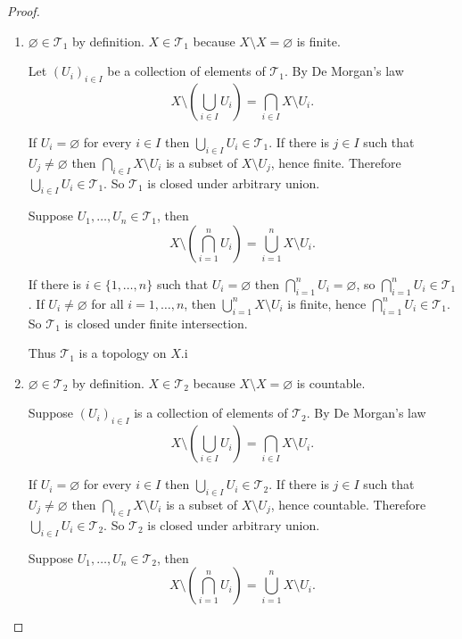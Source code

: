 \begin{proof}
	\begin{enumerate}[label={(\alph*)}]
		\item $\varnothing\in\mathscr{T}_{1}$ by definition. $X\in\mathscr{T}_{1}$ because $X\setminus X = \varnothing$ is finite.

		      Let ${(U_{i})}_{i\in I}$ be a collection of elements of $\mathscr{T}_{1}$. By De Morgan's law
		      \[
			      X\setminus \left(\bigcup_{i\in I} U_{i}\right) = \bigcap_{i\in I} X\setminus U_{i}.
		      \]

		      If $U_{i} = \varnothing$ for every $i\in I$ then $\bigcup_{i\in I} U_{i}\in\mathscr{T}_{1}$. If there is $j\in I$ such that $U_{j}\ne\varnothing$ then $\bigcap_{i\in I} X\setminus U_{i}$ is a subset of $X\setminus U_{j}$, hence finite. Therefore $\bigcup_{i\in I} U_{i}\in\mathscr{T}_{1}$. So $\mathscr{T}_{1}$ is closed under arbitrary union.

		      Suppose $U_{1}, \ldots, U_{n}\in\mathscr{T}_{1}$, then
		      \[
			      X\setminus \left(\bigcap^{n}_{i=1}U_{i}\right) = \bigcup^{n}_{i=1}X\setminus U_{i}.
		      \]

		      If there is $i \in \{1,\ldots,n\}$ such that $U_{i} = \varnothing$ then $\bigcap^{n}_{i=1}U_{i} = \varnothing$, so $\bigcap^{n}_{i=1}U_{i}\in\mathscr{T}_{1}$.  If $U_{i}\ne\varnothing$ for all $i=1,\ldots,n$, then $\bigcup^{n}_{i=1}X\setminus U_{i}$ is finite, hence $\bigcap^{n}_{i=1}U_{i}\in\mathscr{T}_{1}$. So $\mathscr{T}_{1}$ is closed under finite intersection.

		      Thus $\mathscr{T}_{1}$ is a topology on $X$.i
		\item $\varnothing\in\mathscr{T}_{2}$ by definition. $X\in\mathscr{T}_{2}$ because $X\setminus X = \varnothing$ is countable.

		      Suppose ${(U_{i})}_{i\in I}$ is a collection of elements of $\mathscr{T}_{2}$. By De Morgan's law
		      \[
			      X\setminus \left(\bigcup_{i\in I} U_{i}\right) = \bigcap_{i\in I} X\setminus U_{i}.
		      \]

		      If $U_{i} = \varnothing$ for every $i\in I$ then $\bigcup_{i\in I} U_{i}\in\mathscr{T}_{2}$. If there is $j\in I$ such that $U_{j}\ne\varnothing$ then $\bigcap_{i\in I} X\setminus U_{i}$ is a subset of $X\setminus U_{j}$, hence countable. Therefore $\bigcup_{i\in I} U_{i}\in\mathscr{T}_{2}$. So $\mathscr{T}_{2}$ is closed under arbitrary union.

		      Suppose $U_{1}, \ldots, U_{n}\in\mathscr{T}_{2}$, then
		      \[
			      X\setminus \left(\bigcap^{n}_{i=1}U_{i}\right) = \bigcup^{n}_{i=1}X\setminus U_{i}.
		      \]


\end{enumerate}
\end{proof}
